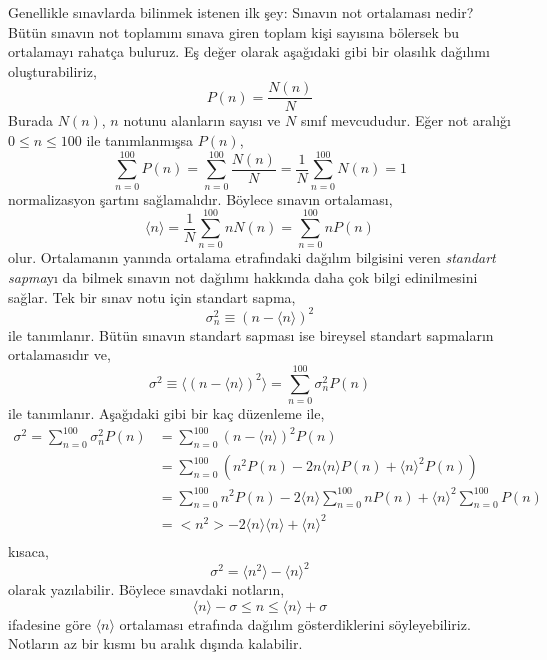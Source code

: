 \documentclass[00_kitap.tex]{subfiles}
\begin{document}
Genellikle sınavlarda bilinmek istenen ilk şey: Sınavın not ortalaması nedir? Bütün sınavın not toplamını sınava giren toplam kişi sayısına bölersek bu ortalamayı rahatça buluruz. Eş değer olarak aşağıdaki gibi bir olasılık dağılımı oluşturabiliriz,
\begin{equation}
P\left( n\right) =\dfrac {N(n) }{N}
\label{eq:probability_distrubition_P}
\end{equation}
Burada $N(n)$, $n$ notunu alanların sayısı ve $N$ sınıf mevcududur. Eğer not aralığı $0\leq n \leq 100$ ile tanımlanmışsa $P(n)$,
\begin{equation}
\sum ^{100}_{n=0}P\left( n\right) =\sum ^{100}_{n=0}\dfrac {N(n) }{N}=\dfrac {1}{N}\sum ^{100}_{n=0}N(n) =1
\label{eq:normalization_P}
\end{equation}
normalizasyon şartını sağlamalıdır. Böylece sınavın ortalaması,
\begin{equation}
\langle n \rangle =\dfrac {1}{N}\sum ^{100}_{n=0}nN\left( n\right) =\sum ^{100}_{n=0}nP\left( n\right) 
\label{eq:average_grade}
\end{equation}
olur. Ortalamanın yanında ortalama etrafındaki dağılım bilgisini veren \emph{standart sapma}yı da bilmek sınavın not dağılımı hakkında daha çok bilgi edinilmesini sağlar. Tek bir sınav notu için standart sapma,
\begin{equation}
\sigma ^{2}_{n}\equiv(n-\langle n\rangle) ^{2}
\label{eq:standard_deviation_atom}
\end{equation}
ile tanımlanır. Bütün sınavın standart sapması ise bireysel standart sapmaların ortalamasıdır ve,
\begin{equation}
\sigma ^{2}\equiv \langle \left( n-\langle n\rangle \right) ^{2}\rangle =\sum ^{100}_{n=0}\sigma _{n}^2P\left( n\right) 
\label{eq:standard_deviation_exam}
\end{equation}
ile tanımlanır. Aşağıdaki gibi bir kaç düzenleme ile,
\begin{align*}
\sigma ^{2}=\sum ^{100}_{n=0}\sigma ^{2}_{n}P\left( n\right) &=\sum ^{100}_{n=0}\left(n -\langle n\rangle \right) ^{2}P\left( n\right) \\
&=\sum ^{100}_{n=0}\left( n^{2}P\left( n\right) -2n\langle n\rangle P\left( n\right) +\langle n\rangle ^{2}P\left( n\right) \right)\\
&=\sum ^{100}_{n=0}n^{2}P\left( n\right) -2 \langle n \rangle\sum ^{100}_{n=0}nP\left( n\right) +\langle n\rangle ^{2}\sum ^{100}_{n=0}P\left( n\right) \\
&=<n^{2}>-2 \langle n \rangle\langle n\rangle +\langle n\rangle ^{2}\\
\end{align*}
kısaca,
\begin{equation}
\sigma^2 = \langle n^{2}\rangle - \langle n \rangle^{2}
\end{equation}
olarak yazılabilir. Böylece sınavdaki notların,
\begin{equation*}
\langle n \rangle - \sigma \leq n \leq \langle n \rangle + \sigma
\end{equation*}
ifadesine göre $\langle n \rangle$ ortalaması etrafında dağılım gösterdiklerini söyleyebiliriz. Notların az bir kısmı bu aralık dışında kalabilir.
\end{document}
